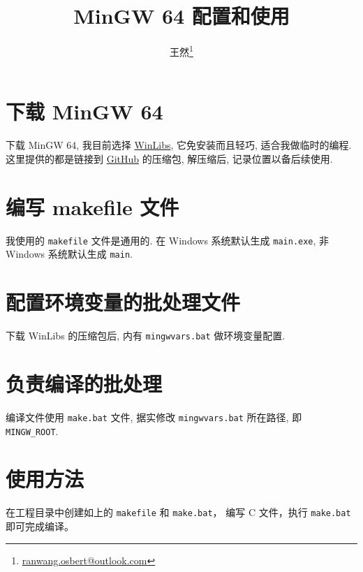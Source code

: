 \documentclass{ctexart}
\title{MinGW 64 配置和使用}
\author{王然\thanks{\url{ranwang.osbert@outlook.com}}}
\date{}
\begin{document}
  
\maketitle

\section{下载 MinGW 64}

下载 MinGW 64,
我目前选择 \href{https://winlibs.com/#download-release}{WinLibs},
它免安装而且轻巧,
适合我做临时的编程.
这里提供的都是链接到 \href{https://github.com/brechtsanders/winlibs_mingw/releases/download/15.2.0posix-13.0.0-ucrt-r5/winlibs-x86_64-posix-seh-gcc-15.2.0-mingw-w64ucrt-13.0.0-r5.7z}{GitHub} 的压缩包,
解压缩后,
记录位置以备后续使用.

\section{编写 makefile 文件}

我使用的 \texttt{makefile} 文件是通用的.
在 Windows 系统默认生成 \texttt{main.exe},
非 Windows 系统默认生成 \texttt{main}.


\section{配置环境变量的批处理文件}

下载 WinLibs 的压缩包后,
内有 \texttt{mingwvars.bat} 做环境变量配置.


\section{负责编译的批处理}

编译文件使用 \texttt{make.bat} 文件,
据实修改 \texttt{mingwvars.bat} 所在路径,
即 \texttt{MINGW\_ROOT}.


\section{使用方法}

在工程目录中创建如上的 \texttt{makefile} 和 \texttt{make.bat}，
编写 C 文件，执行 \texttt{make.bat} 即可完成编译。
\end{document}
